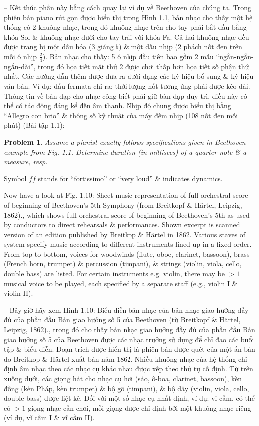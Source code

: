 \documentclass{article}
\newtheorem{problem}{Problem}
\begin{document}
\begin{itemize}
\begin{itemize}
\begin{itemize}
			-- Kết thúc phần này bằng cách quay lại ví dụ về Beethoven của chúng ta. Trong phiên bản piano rút gọn được hiển thị trong {\sf Hình 1.1}, bản nhạc cho thấy một hệ thống có 2 khuông nhạc, trong đó khuông nhạc trên cho tay phải bắt đầu bằng khóa Sol \& khuông nhạc dưới cho tay trái với khóa Fa. Cả hai khuông nhạc đều được trang bị một dấu hóa (3 giáng $\flat$) \& một dấu nhịp (2 phách nốt đen trên mỗi ô nhịp $\frac{2}{4}$). Bản nhạc cho thấy: 5 ô nhịp đầu tiên bao gồm 2 mẫu ``ngắn-ngắn-ngắn-dài'', trong đó họa tiết mặt thứ 2 được chơi thấp hơn họa tiết số phận thứ nhất. Các hướng dẫn thêm được đưa ra dưới dạng các ký hiệu bổ sung \& ký hiệu văn bản. Ví dụ: dấu fermata chỉ ra: thời lượng nốt tương ứng phải được kéo dài. Thông tin về bàn đạp cho nhạc công biết phải giữ bàn đạp duy trì, điều này có thể có tác động đáng kể đến âm thanh. Nhịp độ chung được biểu thị bằng ``Allegro con brio'' \& thông số kỹ thuật của máy đếm nhịp (108 nốt đen mỗi phút) (Bài tập 1.1):
			\begin{problem}
				Assume a pianist exactly follows specifications given in Beethoven example from Fig. 1.1. Determine duration (in millisecs) of a quarter note \& a measure, resp.
			\end{problem}
			Symbol $ff$ stands for ``fortissimo'' or ``very loud'' \& indicates dynamics.
			
			Now have a look at {\sf Fig. 1.10: Sheet music representation of full orchestral score of beginning of {\sc Beethoven}'s 5th Symphony (from Breitkopf \& Härtel, Leipzig, 1862).}, which shows full orchestral score of beginning of {\sc Beethoven}'s 5th as used by conductors to direct rehearsals \& performances. Shown excerpt is scanned version of an edition published by Breitkop \& Härtel in 1862. Various staves of system specify music according to different instruments lined up in a fixed order. From top to bottom, voices for woodwinds (flute, oboe, clarinet, bassoon), brass (French horn, trumpet) \& percussion (timpani), \& strings (violin, viola, cello, double bass) are listed. For certain instruments e.g. violin, there may be $> 1$ musical voice to be played, each specified by a separate staff (e.g., violin I \& violin II).
			
			-- Bây giờ hãy xem {\sf Hình 1.10: Biểu diễn bản nhạc của bản nhạc giao hưởng đầy đủ của phần đầu Bản giao hưởng số 5 của {\sc Beethoven} (từ Breitkopf \& Härtel, Leipzig, 1862).}, trong đó cho thấy bản nhạc giao hưởng đầy đủ của phần đầu Bản giao hưởng số 5 của {\sc Beethoven} được các nhạc trưởng sử dụng để chỉ đạo các buổi tập \& biểu diễn. Đoạn trích được hiển thị là phiên bản được quét của một ấn bản do Breitkop \& Härtel xuất bản năm 1862. Nhiều khuông nhạc của hệ thống chỉ định âm nhạc theo các nhạc cụ khác nhau được xếp theo thứ tự cố định. Từ trên xuống dưới, các giọng hát cho nhạc cụ hơi (sáo, ô-boa, clarinet, bassoon), kèn đồng (kèn Pháp, kèn trumpet) \& bộ gõ (timpani), \& bộ dây (violin, viola, cello, double bass) được liệt kê. Đối với một số nhạc cụ nhất định, ví dụ: vĩ cầm, có thể có $> 1$ giọng nhạc cần chơi, mỗi giọng được chỉ định bởi một khuông nhạc riêng (ví dụ, vĩ cầm I \& vĩ cầm II).
			

\end{itemize}
\end{itemize}
\end{itemize}
\end{document}
